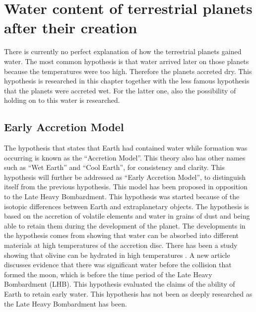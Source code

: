 \section{\label{chap:creation}Water content of terrestrial planets after their creation}
There is currently no perfect explanation of how the terrestrial planets gained water. The most common hypothesis is that water arrived later on those planets because the temperatures were too high. Therefore the planets accreted dry. This hypothesis is researched in this chapter together with the less famous hypothesis that the planets were accreted wet. For the latter one, also the possibility of holding on to this water is researched.


\subsection{Early Accretion Model}
The hypothesis that states that Earth had contained water while formation was occurring is known as the “Accretion Model”. This theory also has other names such as “Wet Earth” and “Cool Earth”, for consistency and clarity. This hypothesis will further be addressed as “Early Accretion Model”, to distinguish itself from the previous hypothesis. This model has been proposed in opposition to the Late Heavy Bombardment. This hypothesis was started because of the isotopic differences between Earth and extraplanetary objects. The hypothesis is based on the accretion of volatile elements and water in grains of dust and being able to retain them during the development of the planet. The developments in the hypothesis comes from showing that water can be absorbed into different materials at high temperatures of the accretion disc. There has been a study showing that olivine can be hydrated in high temperatures \cite{BOMB11} \cite{BOMB12}. A new article \cite{BOMB13} discusses evidence that there was significant water before the collision that formed the moon, which is before the time period of the Late Heavy Bombardment (LHB). This hypothesis evaluated the claims of the ability of Earth to retain early water. This hypothesis has not been as deeply researched as the Late Heavy Bombardment has been.


